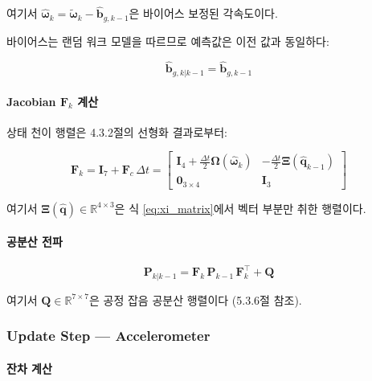 \noindent 여기서 $\hat{\boldsymbol{\omega}}_k = \tilde{\boldsymbol{\omega}}_k - \hat{\mathbf{b}}_{g,k-1}$은
바이어스 보정된 각속도이다.

바이어스는 랜덤 워크 모델을 따르므로 예측값은 이전 값과 동일하다:

\begin{equation}
    \hat{\mathbf{b}}_{g,k|k-1} = \hat{\mathbf{b}}_{g,k-1}
    \label{eq:ekf_bias_prop}
\end{equation}

\paragraph{Jacobian $\mathbf{F}_k$ 계산}

상태 천이 행렬은 4.3.2절의 선형화 결과로부터:

\begin{equation}
    \mathbf{F}_k = \mathbf{I}_7 + \mathbf{F}_c\,\Delta t =
    \begin{bmatrix}
        \mathbf{I}_4 + \frac{\Delta t}{2}\boldsymbol{\Omega}(\hat{\boldsymbol{\omega}}_k) &
        -\frac{\Delta t}{2}\boldsymbol{\Xi}(\hat{\mathbf{q}}_{k-1}) \\[6pt]
        \mathbf{0}_{3\times 4} & \mathbf{I}_3
    \end{bmatrix}
    \label{eq:ekf_F_matrix}
\end{equation}

\noindent 여기서 $\boldsymbol{\Xi}(\hat{\mathbf{q}}) \in \mathbb{R}^{4\times 3}$은
식 \eqref{eq:xi_matrix}에서 벡터 부분만 취한 행렬이다.

\paragraph{공분산 전파}

\begin{equation}
    \mathbf{P}_{k|k-1} = \mathbf{F}_k\,\mathbf{P}_{k-1}\,\mathbf{F}_k^\top + \mathbf{Q}
    \label{eq:ekf_cov_prop}
\end{equation}

\noindent 여기서 $\mathbf{Q} \in \mathbb{R}^{7\times 7}$은 공정 잡음 공분산 행렬이다
(5.3.6절 참조).

\subsubsection{Update Step — Accelerometer}

\paragraph{잔차 계산}

